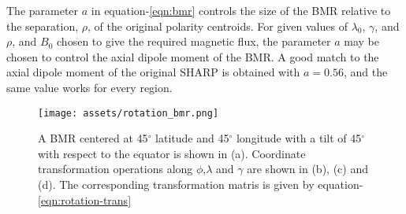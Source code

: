 \documentclass[twoside,12pt]{book}
\begin{document}
The parameter $a$ in equation-\ref{eqn:bmr} controls the size of the BMR relative to the separation, $\rho$, of the original polarity centroids. For given values of $\lambda_0$, $\gamma$, and $\rho$, and $B_0$ chosen to give the required magnetic flux, the parameter $a$ may be chosen to control the axial dipole moment of the BMR. A good match to the axial dipole moment of the original SHARP is obtained with $a=0.56$, and the same value works for every region.

\begin{figure}
    \centering
    \texttt{[image: assets/rotation\_bmr.png]}
    \caption{A BMR centered at 45$^{\circ}$ latitude and 45$^{\circ}$ longitude with a tilt of 45$^{\circ}$ with respect to the equator is shown in (a). Coordinate transformation operations along $\phi$,$\lambda$ and $\gamma$ are shown in (b), (c) and (d). The corresponding transformation matris is given by equation-\ref{eqn:rotation-trans}}
\end{figure}






\end{document}
